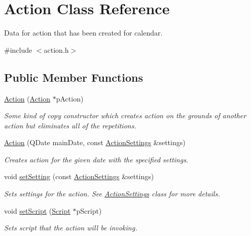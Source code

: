 \hypertarget{class_action}{\section{Action Class Reference}
\label{class_action}
}


Data for action that has been created for calendar.  




{\ttfamily \#include $<$action.\-h$>$}

\subsection*{Public Member Functions}
\begin{DoxyCompactItemize}
\item 
\hyperlink{class_action_a2da5fdc807e9635c6f9f233f9f05440a}{Action} (\hyperlink{class_action}{Action} $\ast$p\-Action)
\begin{DoxyCompactList}\small\item\em Some kind of copy constructor which creates action on the grounds of another action but eliminates all of the repetitions. \end{DoxyCompactList}\item 
\hyperlink{class_action_ad8712ab574b1bea904a0cb65f211945b}{Action} (Q\-Date main\-Date, const \hyperlink{class_action_settings}{Action\-Settings} \&settings)
\begin{DoxyCompactList}\small\item\em Creates action for the given date with the specified settings. \end{DoxyCompactList}\item 
void \hyperlink{class_action_ab0dcff3e1da9b7bf4ffbc5cb37c56bba}{set\-Setting} (const \hyperlink{class_action_settings}{Action\-Settings} \&settings)
\begin{DoxyCompactList}\small\item\em Sets settings for the action. See \hyperlink{class_action_settings}{Action\-Settings} class for more details. \end{DoxyCompactList}\item 
void \hyperlink{class_action_a4c98125d275b28055dd1e96c3091fd52}{set\-Script} (\hyperlink{class_script}{Script} $\ast$p\-Script)
\begin{DoxyCompactList}\small\item\em Sets script that the action will be invoking. \end{DoxyCompactList}\item 

\end{DoxyCompactItemize}
